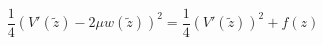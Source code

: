 \begin{equation}
\frac 14(V'(\tilde z) - 2\mu w(\tilde z))^2 =\frac 14(V'(\tilde z))^2+ f(z)
\end{equation}

